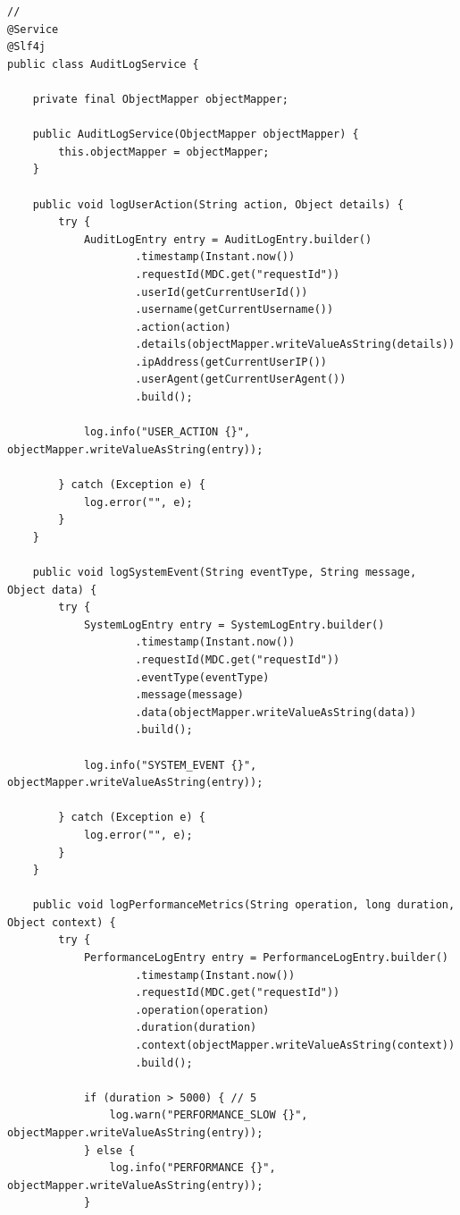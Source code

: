 \begin{lstlisting}[style=java]
// 
@Service
@Slf4j
public class AuditLogService {
    
    private final ObjectMapper objectMapper;
    
    public AuditLogService(ObjectMapper objectMapper) {
        this.objectMapper = objectMapper;
    }
    
    public void logUserAction(String action, Object details) {
        try {
            AuditLogEntry entry = AuditLogEntry.builder()
                    .timestamp(Instant.now())
                    .requestId(MDC.get("requestId"))
                    .userId(getCurrentUserId())
                    .username(getCurrentUsername())
                    .action(action)
                    .details(objectMapper.writeValueAsString(details))
                    .ipAddress(getCurrentUserIP())
                    .userAgent(getCurrentUserAgent())
                    .build();
                    
            log.info("USER_ACTION {}", objectMapper.writeValueAsString(entry));
            
        } catch (Exception e) {
            log.error("", e);
        }
    }
    
    public void logSystemEvent(String eventType, String message, Object data) {
        try {
            SystemLogEntry entry = SystemLogEntry.builder()
                    .timestamp(Instant.now())
                    .requestId(MDC.get("requestId"))
                    .eventType(eventType)
                    .message(message)
                    .data(objectMapper.writeValueAsString(data))
                    .build();
                    
            log.info("SYSTEM_EVENT {}", objectMapper.writeValueAsString(entry));
            
        } catch (Exception e) {
            log.error("", e);
        }
    }
    
    public void logPerformanceMetrics(String operation, long duration, Object context) {
        try {
            PerformanceLogEntry entry = PerformanceLogEntry.builder()
                    .timestamp(Instant.now())
                    .requestId(MDC.get("requestId"))
                    .operation(operation)
                    .duration(duration)
                    .context(objectMapper.writeValueAsString(context))
                    .build();
                    
            if (duration > 5000) { // 5
                log.warn("PERFORMANCE_SLOW {}", objectMapper.writeValueAsString(entry));
            } else {
                log.info("PERFORMANCE {}", objectMapper.writeValueAsString(entry));
            }
            

\end{lstlisting}
